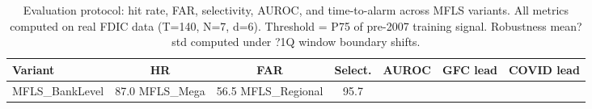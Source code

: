 \begin{table}[htbp]
\centering
\caption{Evaluation protocol: hit rate, FAR, selectivity, AUROC, and time-to-alarm across MFLS variants. All metrics computed on real FDIC data (T=140, N=7, d=6). Threshold = P75 of pre-2007 training signal. Robustness mean?std computed under ?1Q window boundary shifts.}
\label{tab:eval_protocol}
\begin{tabular}{lcccccc}
\toprule
Variant & HR & FAR & Select. & AUROC & GFC lead & COVID lead \\
\midrule
MFLS_BankLevel & 87.0%
MFLS_Mega & 56.5%
MFLS_Regional & 95.7%
\bottomrule
\end{tabular}
\end{table}
